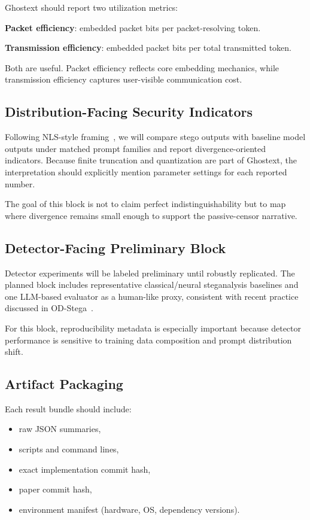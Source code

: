 Ghostext should report two utilization metrics:

\textbf{Packet efficiency}: embedded packet bits per packet-resolving token.

\textbf{Transmission efficiency}: embedded packet bits per total transmitted token.

Both are useful. Packet efficiency reflects core embedding mechanics, while transmission efficiency captures user-visible communication cost.

\subsection{Distribution-Facing Security Indicators}

Following NLS-style framing~\cite{ziegler2019neural}, we will compare stego outputs with baseline model outputs under matched prompt families and report divergence-oriented indicators. Because finite truncation and quantization are part of Ghostext, the interpretation should explicitly mention parameter settings for each reported number.

The goal of this block is not to claim perfect indistinguishability but to map where divergence remains small enough to support the passive-censor narrative.

\subsection{Detector-Facing Preliminary Block}

Detector experiments will be labeled preliminary until robustly replicated. The planned block includes representative classical/neural steganalysis baselines and one LLM-based evaluator as a human-like proxy, consistent with recent practice discussed in OD-Stega~\cite{huang2026odstega}.

For this block, reproducibility metadata is especially important because detector performance is sensitive to training data composition and prompt distribution shift.

\subsection{Artifact Packaging}

Each result bundle should include:

\begin{itemize}
\item raw JSON summaries,
\item scripts and command lines,
\item exact implementation commit hash,
\item paper commit hash,
\item environment manifest (hardware, OS, dependency versions).
\end{itemize}


